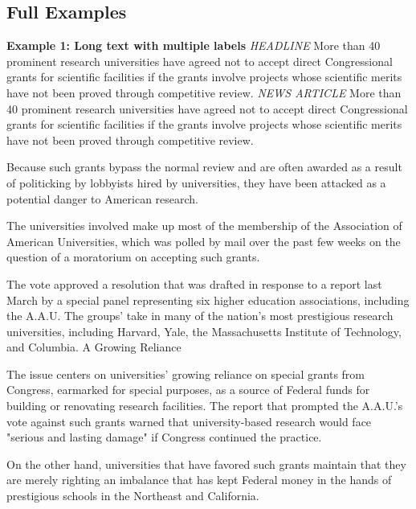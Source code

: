 \documentclass{article}
\begin{document}
\subsection{Full Examples} 

\textbf{Example 1: Long text with multiple labels} \label{appendix_example_1}
\newline
\newline
\textit{HEADLINE}
\newline
\newline
More than 40 prominent research universities have agreed not to accept direct Congressional grants for scientific facilities if the grants involve projects whose scientific merits have not been proved through competitive review.
\newline
\newline
\textit{NEWS ARTICLE}
\newline
\newline
More than 40 prominent research universities have agreed not to accept direct Congressional grants for scientific facilities if the grants involve projects whose scientific merits have not been proved through competitive review.

Because such grants bypass the normal review and are often awarded as a result of politicking by lobbyists hired by universities, they have been attacked as a potential danger to American research.

The universities involved make up most of the membership of the Association of American Universities, which was polled by mail over the past few weeks on the question of a moratorium on accepting such grants.

The vote approved a resolution that was drafted in response to a report last March by a special panel representing six higher education associations, including the A.A.U. The groups' take in many of the nation's most prestigious research universities, including Harvard, Yale, the Massachusetts Institute of Technology, and Columbia. A Growing Reliance

The issue centers on universities' growing reliance on special grants from Congress, earmarked for special purposes, as a source of Federal funds for building or renovating research facilities. The report that prompted the A.A.U.'s vote against such grants warned that university-based research would face "serious and lasting damage" if Congress continued the practice.

On the other hand, universities that have favored such grants maintain that they are merely righting an imbalance that has kept Federal money in the hands of prestigious schools in the Northeast and California.
\end{document}
